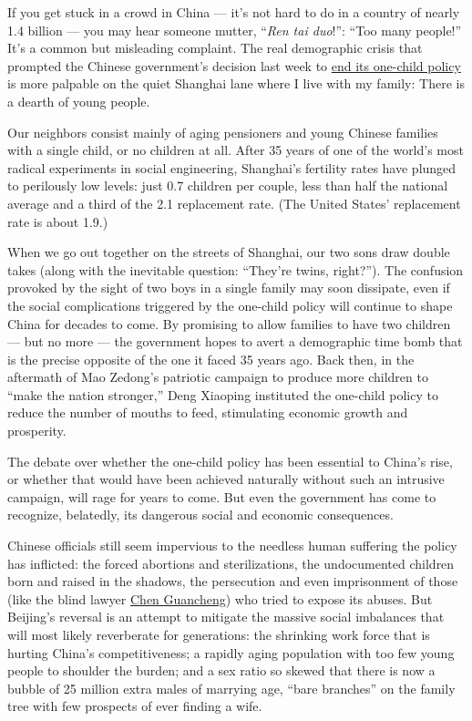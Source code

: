 If you get stuck in a crowd in China --- it's not hard to do in a
country of nearly 1.4 billion --- you may hear someone mutter,
``\emph{Ren tai duo}!'': ``Too many people!'' It's a common but
misleading complaint. The real demographic crisis that prompted the
Chinese government's decision last week to
\href{http://www.nytimes3xbfgragh.onion/2015/10/30/world/asia/china-end-one-child-policy.html}{end
its one-child policy} is more palpable on the quiet Shanghai lane where
I live with my family: There is a dearth of young people.

Our neighbors consist mainly of aging pensioners and young Chinese
families with a single child, or no children at all. After 35 years of
one of the world's most radical experiments in social engineering,
Shanghai's fertility rates have plunged to perilously low levels: just
0.7 children per couple, less than half the national average and a third
of the 2.1 replacement rate. (The United States' replacement rate is
about 1.9.)

When we go out together on the streets of Shanghai, our two sons draw
double takes (along with the inevitable question: ``They're twins,
right?''). The confusion provoked by the sight of two boys in a single
family may soon dissipate, even if the social complications triggered by
the one-child policy will continue to shape China for decades to come.
By promising to allow families to have two children --- but no more ---
the government hopes to avert a demographic time bomb that is the
precise opposite of the one it faced 35 years ago. Back then, in the
aftermath of Mao Zedong's patriotic campaign to produce more children to
``make the nation stronger,'' Deng Xiaoping instituted the one-child
policy to reduce the number of mouths to feed, stimulating economic
growth and prosperity.

The debate over whether the one-child policy has been essential to
China's rise, or whether that would have been achieved naturally without
such an intrusive campaign, will rage for years to come. But even the
government has come to recognize, belatedly, its dangerous social and
economic consequences.

Chinese officials still seem impervious to the needless human suffering
the policy has inflicted: the forced abortions and sterilizations, the
undocumented children born and raised in the shadows, the persecution
and even imprisonment of those (like the blind lawyer
\href{http://www.nytimes3xbfgragh.onion/2012/05/20/world/asia/china-dissident-chen-guangcheng-united-states.html}{Chen
Guancheng}) who tried to expose its abuses. But Beijing's reversal is an
attempt to mitigate the massive social imbalances that will most likely
reverberate for generations: the shrinking work force that is hurting
China's competitiveness; a rapidly aging population with too few young
people to shoulder the burden; and a sex ratio so skewed that there is
now a bubble of 25 million extra males of marrying age, ``bare
branches'' on the family tree with few prospects of ever finding a wife.

